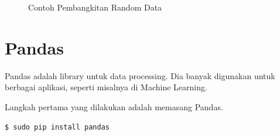 \begin{figure}[ht]
\caption{Contoh Pembangkitan Random Data}
\label{fig:randomnumpy}
\end{figure}

\section{Pandas}
Pandas adalah library untuk data processing. Dia banyak digunakan untuk
berbagai aplikasi, seperti misalnya di Machine Learning.

Langkah pertama yang dilakukan adalah memasang Pandas.

\begin{verbatim}
$ sudo pip install pandas
\end{verbatim}
